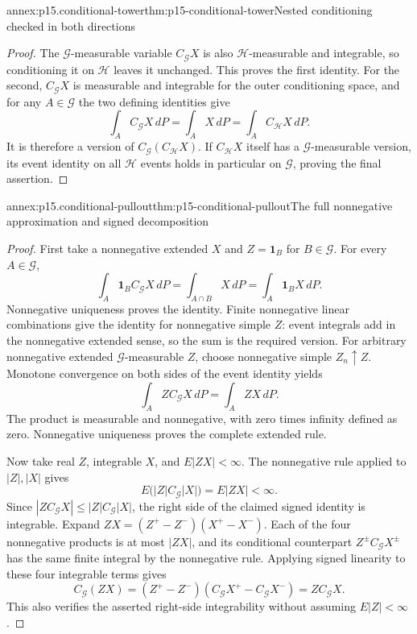 \begin{annexitem}{annex:p15.conditional-tower}{thm:p15-conditional-tower}{Nested conditioning checked in both directions}
\begin{proof}
The \(\mathcal G\)-measurable variable \(C_{\mathcal G}X\) is
also \(\mathcal H\)-measurable and integrable, so conditioning it
on \(\mathcal H\) leaves it unchanged. This proves the first identity.
For the second, \(C_{\mathcal G}X\) is measurable and integrable
for the outer conditioning space, and for any \(A\in\mathcal G\)
the two defining identities give
\[
                 \int_A C_{\mathcal G}X\,dP
                    =\int_AX\,dP
                    =\int_A C_{\mathcal H}X\,dP.
\]
It is therefore a version of \(C_{\mathcal G}(C_{\mathcal H}X)\).
If \(C_{\mathcal H}X\) itself has a \(\mathcal G\)-measurable
version, its event identity on all \(\mathcal H\) events holds
in particular on \(\mathcal G\), proving the final assertion.
\end{proof}
\end{annexitem}

\begin{annexitem}{annex:p15.conditional-pullout}{thm:p15-conditional-pullout}{The full nonnegative approximation and signed decomposition}
\begin{proof}
First take a nonnegative extended \(X\) and \(Z=\mathbf1_B\)
for \(B\in\mathcal G\). For every \(A\in\mathcal G\),
\[
                 \int_A\mathbf1_B C_{\mathcal G}X\,dP
                     =\int_{A\cap B}X\,dP
                     =\int_A\mathbf1_BX\,dP.
\]
Nonnegative uniqueness proves the identity.
Finite nonnegative linear combinations give the identity for
nonnegative simple \(Z\): event integrals add in the nonnegative
extended sense, so the sum is the required version.
For arbitrary nonnegative extended \(\mathcal G\)-measurable \(Z\),
choose nonnegative simple \(Z_n\uparrow Z\).
Monotone convergence on both sides of the event identity yields
\[
                       \int_A ZC_{\mathcal G}X\,dP=\int_AZX\,dP.
\]
The product is measurable and nonnegative, with zero times infinity
defined as zero. Nonnegative uniqueness proves the complete extended rule.

Now take real \(Z\), integrable \(X\), and \(E|ZX|<\infty\).
The nonnegative rule applied to \(|Z|,|X|\) gives
\[
                   E\bigl(|Z|C_{\mathcal G}|X|\bigr)=E|ZX|<\infty.
\]
Since \(|ZC_{\mathcal G}X|\leq |Z|C_{\mathcal G}|X|\), the right
side of the claimed signed identity is integrable.
Expand \(ZX=(Z^+-Z^-)(X^+-X^-)\).
Each of the four nonnegative products is at most \(|ZX|\),
and its conditional counterpart \(Z^\pm C_{\mathcal G}X^\pm\)
has the same finite integral by the nonnegative rule.
Applying signed linearity to these four integrable terms gives
\[
                 C_{\mathcal G}(ZX)
                      =(Z^+-Z^-)(C_{\mathcal G}X^+-C_{\mathcal G}X^-)
                      =ZC_{\mathcal G}X .
\]
This also verifies the asserted right-side integrability without
assuming \(E|Z|<\infty\).
\end{proof}
\end{annexitem}

